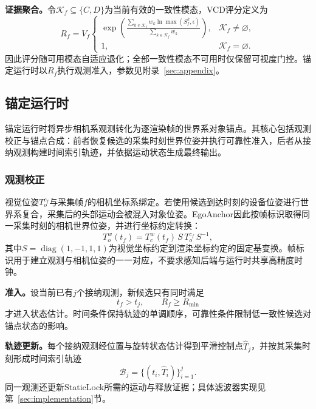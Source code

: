 \documentclass[review]{vgtc}
\begin{document}
\textbf{证据聚合。}令$\mathcal K_f\subseteq\{C,D\}$为当前有效的一致性模态，VCD评分定义为
\begin{equation}
R_f = V_f
\begin{cases}
\displaystyle
\exp\!\left(
\frac{\sum_{k\in\mathcal K_f} w_k\ln\!\max(S_f^k,\epsilon)}
{\sum_{k\in\mathcal K_f} w_k}
\right), & \mathcal K_f\neq\varnothing, \\
1, & \mathcal K_f=\varnothing.
\end{cases}
\label{eq:vcd}
\end{equation}
因此评分随可用模态自适应退化；全部一致性模态不可用时仅保留可视度门控。锚定运行时以$R_f$执行观测准入，参数见附录~\ref{sec:appendix}。

\subsection{锚定运行时}\label{sec:anchoring}

锚定运行时将异步相机系观测转化为逐渲染帧的世界系对象锚点。其核心包括观测校正与锚点合成：前者恢复候选的采集时刻世界位姿并执行可靠性准入，后者从接纳观测构建时间索引轨迹，并依据运动状态生成最终输出。

\subsubsection{观测校正}\label{sec:obs-update}

视觉位姿$T_o^{c_f}$与采集帧$f$的相机坐标系绑定。若使用候选到达时刻的设备位姿进行世界系复合，采集后的头部运动会被混入对象位姿。EgoAnchor因此按帧标识取得同一采集时刻的相机世界位姿，并进行坐标约定转换：
\begin{equation}
T_o^w(t_f)=T_c^w(t_f)\,S\,T_o^{c_f}\,S^{-1},
\label{eq:capture-alignment}
\end{equation}
其中$S=\operatorname{diag}(1,-1,1,1)$为视觉坐标约定到渲染坐标约定的固定基变换。帧标识用于建立观测与相机位姿的一一对应，不要求感知后端与运行时共享高精度时钟。

\textbf{准入。}设当前已有$j$个接纳观测，新候选只有同时满足
\begin{equation}
t_f>t_j,\qquad R_f\ge R_{\min}
\label{eq:admission}
\end{equation}
才进入状态估计。时间条件保持轨迹的单调顺序，可靠性条件限制低一致性候选对锚点状态的影响。

\textbf{轨迹更新。}每个接纳观测经位置与旋转状态估计得到平滑控制点$\widehat T_j$，并按其采集时刻形成时间索引轨迹
\begin{equation}
\mathcal B_j=\{(t_i,\widehat T_i)\}_{i=1}^{j}.
\label{eq:trajectory}
\end{equation}
同一观测还更新StaticLock所需的运动与释放证据；具体滤波器实现见第~\ref{sec:implementation}节。
\end{document}
